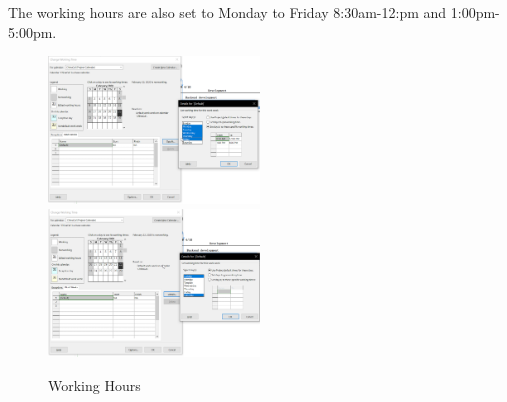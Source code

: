 \documentclass[runningheads]{llncs}
\begin{document}
The working hours are also set to Monday to Friday 8:30am-12:pm and 1:00pm-5:00pm.

\begin{figure}[H]
    \centering
    \includegraphics[width=0.5\textwidth]{./image/workinghours}
    \includegraphics[width=0.5\textwidth]{./image/workinghours2}
    \caption{Working Hours}
\end{figure}
\end{document}
